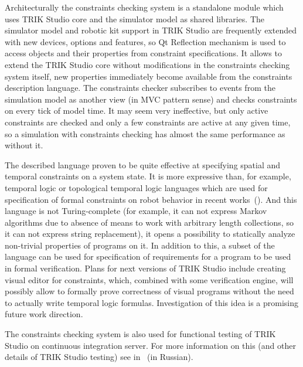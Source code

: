 \documentclass[conference]{IEEEtran}
\begin{document}
Architecturally the constraints checking system is a standalone module which uses TRIK Studio core and the simulator model as shared libraries. The simulator model and robotic kit support in TRIK Studio are frequently extended with new devices, options and features, so Qt Reflection mechanism is used to access objects and their properties from constraint specifications. It allows to extend the TRIK Studio core without modifications in the constraints checking system itself, new properties immediately become available from the constraints description language. The constraints checker subscribes to events from the simulation model as another view (in MVC pattern sense) and checks constraints on every tick of model time. It may seem very ineffective, but only active constraints are checked and only a few constraints are active at any given time, so a simulation with constraints checking has almost the same performance as without it.

The described language proven to be quite effective at specifying spatial and temporal constraints on a system state. It is more expressive than, for example, temporal logic or topological temporal logic languages which are used for specification of formal constraints on robot behavior in recent works~(\cite{mordvinov2016formal,kress2007s,бугайченко2007разработка,дмитриев2013адаптация}). And this language is not Turing-complete (for example, it can not express Markov algorithms due to absence of means to work with arbitrary length collections, so it can not express string replacement), it opens a possibility to statically analyze non-trivial properties of programs on it. In addition to this, a subset of the language can be used for specification of requirements for a program to be used in formal verification. Plans for next versions of TRIK Studio include creating visual editor for constraints, which, combined with some verification engine, will possibly allow to formally prove correctness of visual programs without the need to actually write temporal logic formulas. Investigation of this idea is a promising future work direction.

The constraints checking system is also used for functional testing of TRIK Studio on continuous integration server. For more information on this (and other details of TRIK Studio testing) see in~\cite{mordvinov2016testing} (in Russian).
\end{document}
